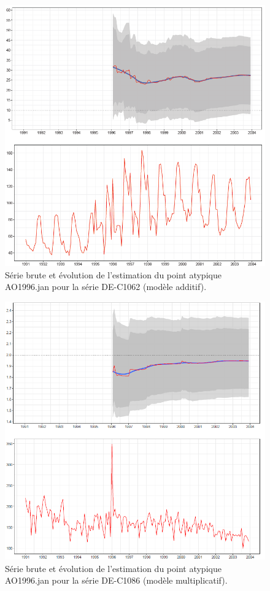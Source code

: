 \documentclass[12pt, a4paper, french]{article}
\begin{document}
\begin{figure}[!ht]
\begin{center}
 \includegraphics[width=16cm]{img/DE-C1062-EstimateAO.PNG}
 \caption{Série brute et évolution de l'estimation du point atypique AO1996.jan pour la série DE-C1062 (modèle additif).}
 \label{fig:DE-C1062}
\end{center}
\end{figure}

\begin{figure}[!ht]
\begin{center}
 \includegraphics[width=16cm]{img/DE-C1086-EstimateAO.PNG}
 \caption{Série brute et évolution de l'estimation du point atypique AO1996.jan pour la série DE-C1086 (modèle multiplicatif).}
 \label{fig:DE-C1086}
\end{center}
\end{figure}
\end{document}
